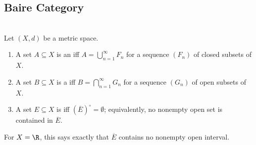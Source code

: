 \subsection{Baire Category}

\begin{definition} \label{def:fsigma-gdelta-nowhere-dense} \\
Let $(X,d)$ be a metric space.
\begin{enumerate}[label=(\roman*)]
\setlength{\itemsep}{0pt}
\item A set $A\subseteq X$ is an  iff $A=\bigcup\limits_{n=1}^{\infty}F_n$ for a sequence $(F_n)$ of closed subsets of $X$.
\item A set $B\subseteq X$ is a  iff $B=\bigcap\limits_{n=1}^{\infty}G_n$ for a sequence $(G_n)$ of open subsets of $X$.
\item A set $E\subseteq X$ is  iff $(\overline{E})^\circ=\emptyset$; equivalently, no nonempty open set is contained in $\overline{E}$.
\end{enumerate}
For $X=\R$, this says exactly that $\overline{E}$ contains no nonempty open interval.
\end{definition}

